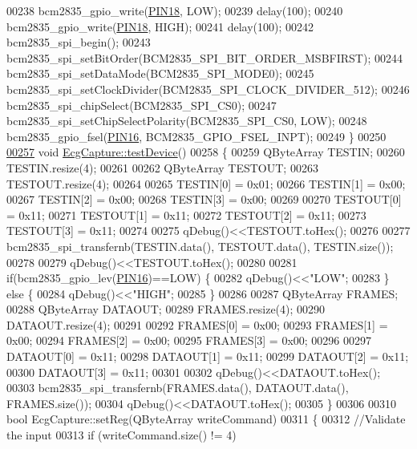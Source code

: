 \begin{DoxyCode}
00238     bcm2835\_gpio\_write(\hyperlink{ecgcapture_8cpp_a42dbee90edd2f61e90f501fa3f667761}{PIN18}, LOW);
00239     delay(100);
00240     bcm2835\_gpio\_write(\hyperlink{ecgcapture_8cpp_a42dbee90edd2f61e90f501fa3f667761}{PIN18}, HIGH);
00241     delay(100);
00242     bcm2835\_spi\_begin();
00243     bcm2835\_spi\_setBitOrder(BCM2835\_SPI\_BIT\_ORDER\_MSBFIRST);
00244     bcm2835\_spi\_setDataMode(BCM2835\_SPI\_MODE0);
00245     bcm2835\_spi\_setClockDivider(BCM2835\_SPI\_CLOCK\_DIVIDER\_512);
00246     bcm2835\_spi\_chipSelect(BCM2835\_SPI\_CS0);
00247     bcm2835\_spi\_setChipSelectPolarity(BCM2835\_SPI\_CS0, LOW);
00248     bcm2835\_gpio\_fsel(\hyperlink{ecgcapture_8cpp_aa8a0f35acb2789eeeecec0b656a199b0}{PIN16}, BCM2835\_GPIO\_FSEL\_INPT);
00249 \}
00250 
\hypertarget{ecgcapture_8cpp_source.tex_l00257}{}\hyperlink{group__Device-Facade_ga9f04dad928d472c92229f3f39a8f2445}{00257} \textcolor{keywordtype}{void} \hyperlink{group__Device-Facade_ga9f04dad928d472c92229f3f39a8f2445}{EcgCapture::testDevice}()
00258 \{
00259     QByteArray TESTIN;
00260     TESTIN.resize(4);
00261 
00262     QByteArray TESTOUT;
00263     TESTOUT.resize(4);
00264 
00265     TESTIN[0] = 0x01;
00266     TESTIN[1] = 0x00;
00267     TESTIN[2] = 0x00;
00268     TESTIN[3] = 0x00;
00269 
00270     TESTOUT[0] = 0x11;
00271     TESTOUT[1] = 0x11;
00272     TESTOUT[2] = 0x11;
00273     TESTOUT[3] = 0x11;
00274 
00275     qDebug()<<TESTOUT.toHex();
00276 
00277     bcm2835\_spi\_transfernb(TESTIN.data(), TESTOUT.data(), TESTIN.size());
00278 
00279     qDebug()<<TESTOUT.toHex();
00280 
00281     \textcolor{keywordflow}{if}(bcm2835\_gpio\_lev(\hyperlink{ecgcapture_8cpp_aa8a0f35acb2789eeeecec0b656a199b0}{PIN16})==LOW) \{
00282         qDebug()<<\textcolor{stringliteral}{"LOW"};
00283     \} \textcolor{keywordflow}{else} \{
00284         qDebug()<<\textcolor{stringliteral}{"HIGH"};
00285     \}
00286 
00287     QByteArray FRAMES;
00288     QByteArray DATAOUT;
00289     FRAMES.resize(4);
00290     DATAOUT.resize(4);
00291 
00292     FRAMES[0] = 0x00;
00293     FRAMES[1] = 0x00;
00294     FRAMES[2] = 0x00;
00295     FRAMES[3] = 0x00;
00296 
00297     DATAOUT[0] = 0x11;
00298     DATAOUT[1] = 0x11;
00299     DATAOUT[2] = 0x11;
00300     DATAOUT[3] = 0x11;
00301 
00302     qDebug()<<DATAOUT.toHex();
00303     bcm2835\_spi\_transfernb(FRAMES.data(), DATAOUT.data(), FRAMES.size());
00304     qDebug()<<DATAOUT.toHex();
00305 \}
00306 
00310 \textcolor{keywordtype}{bool} EcgCapture::setReg(QByteArray writeCommand)
00311 \{
00312     \textcolor{comment}{//Validate the input}
00313     \textcolor{keywordflow}{if} (writeCommand.size() != 4)

\end{DoxyCode}
